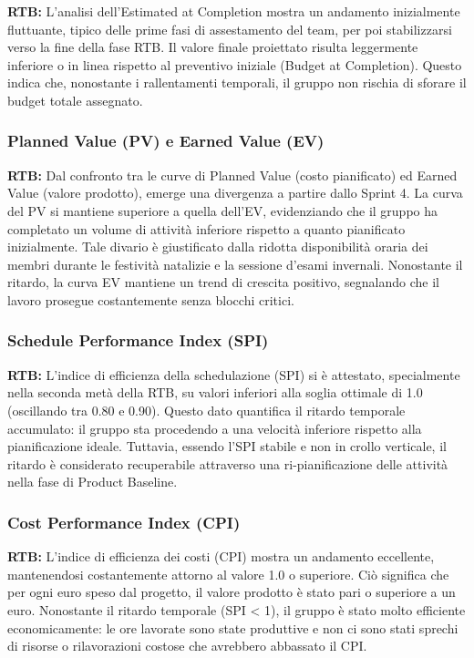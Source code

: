 \documentclass[11pt,a4paper]{article}
\begin{document}
\textbf{RTB:} L'analisi dell'Estimated at Completion mostra un andamento inizialmente fluttuante, tipico delle prime fasi di assestamento del team, per poi stabilizzarsi verso la fine della fase RTB. Il valore finale proiettato risulta leggermente inferiore o in linea rispetto al preventivo iniziale (Budget at Completion). Questo indica che, nonostante i rallentamenti temporali, il gruppo non rischia di sforare il budget totale assegnato.

\newpage
\subsubsection{Planned Value (PV) e Earned Value (EV)}

\textbf{RTB:} Dal confronto tra le curve di Planned Value (costo pianificato) ed Earned Value (valore prodotto), emerge una divergenza a partire dallo Sprint 4. La curva del PV si mantiene superiore a quella dell'EV, evidenziando che il gruppo ha completato un volume di attività inferiore rispetto a quanto pianificato inizialmente. Tale divario è giustificato dalla ridotta disponibilità oraria dei membri durante le festività natalizie e la sessione d'esami invernali. Nonostante il ritardo, la curva EV mantiene un trend di crescita positivo, segnalando che il lavoro prosegue costantemente senza blocchi critici.

\newpage
\subsubsection{Schedule Performance Index (SPI)}

\textbf{RTB:} L'indice di efficienza della schedulazione (SPI) si è attestato, specialmente nella seconda metà della RTB, su valori inferiori alla soglia ottimale di 1.0 (oscillando tra 0.80 e 0.90). Questo dato quantifica il ritardo temporale accumulato: il gruppo sta procedendo a una velocità inferiore rispetto alla pianificazione ideale. Tuttavia, essendo l'SPI stabile e non in crollo verticale, il ritardo è considerato recuperabile attraverso una ri-pianificazione delle attività nella fase di Product Baseline.

\newpage
\subsubsection{Cost Performance Index (CPI)}

\textbf{RTB:} L'indice di efficienza dei costi (CPI) mostra un andamento eccellente, mantenendosi costantemente attorno al valore 1.0 o superiore. Ciò significa che per ogni euro speso dal progetto, il valore prodotto è stato pari o superiore a un euro. Nonostante il ritardo temporale (SPI < 1), il gruppo è stato molto efficiente economicamente: le ore lavorate sono state produttive e non ci sono stati sprechi di risorse o rilavorazioni costose che avrebbero abbassato il CPI.
\end{document}
